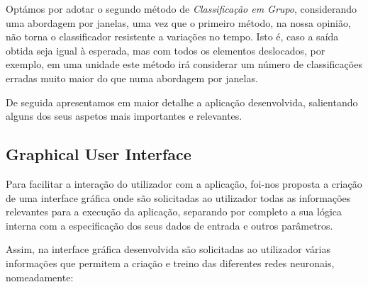 \documentclass{article}
\begin{document}
Optámos por adotar o segundo método de \emph{Classificação em Grupo}, considerando uma abordagem por janelas, uma vez que o primeiro método, na nossa opinião, não torna o classificador resistente a variações no tempo. Isto é, caso a saída obtida seja igual à esperada, mas com todos os elementos deslocados, por exemplo, em uma unidade este método irá considerar um número de classificações erradas muito maior do que numa abordagem por janelas.

De seguida apresentamos em maior detalhe a aplicação desenvolvida, salientando alguns dos seus aspetos mais importantes e relevantes.

\subsection{Graphical User Interface}

Para facilitar a interação do utilizador com a aplicação, foi-nos proposta a criação de uma interface gráfica onde são solicitadas ao utilizador todas as informações relevantes para a execução da aplicação, separando por completo a sua lógica interna com a especificação dos seus dados de entrada e outros parâmetros.

Assim, na interface gráfica desenvolvida são solicitadas ao utilizador várias informações que permitem a criação e treino das diferentes redes neuronais, nomeadamente:
\end{document}
